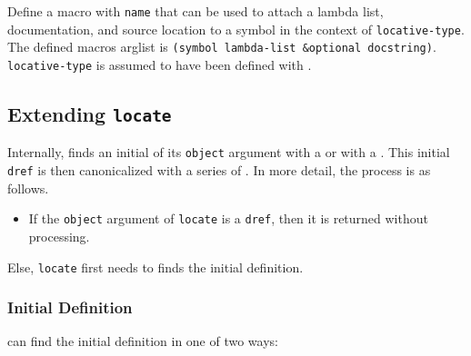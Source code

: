 \begin{itemize}
  Define a macro with \texttt{name} that can be used to attach a lambda
  list, documentation, and source location to a symbol in the context of
  \texttt{locative-type}. The defined macro\textquotesingle s arglist is
  \texttt{(symbol\ lambda-list\ \&optional\ docstring)}.
  \texttt{locative-type} is assumed to have been defined with
  .
\end{itemize}

\subsection{\texorpdfstring{Extending
\texttt{locate}}{Extending locate}}\label{extending-locate}

\label{x-28DREF-EXT-3A-40EXTENDING-LOCATE-20MGL-PAX-3ASECTION-29}

Internally, 
finds an initial  of
its \texttt{object} argument with a
or with a
.
This initial \texttt{dref} is then canonicalized with a series of
.
In more detail, the process is as follows.

\begin{itemize}
\tightlist
\item
  If the \texttt{object} argument of \texttt{locate} is a \texttt{dref},
  then it is returned without processing.
\end{itemize}

Else, \texttt{locate} first needs to finds the initial definition.

\subsubsection{Initial Definition}\label{initial-definition}

\label{x-28DREF-EXT-3A-40INITIAL-DEFINITION-20MGL-PAX-3ASECTION-29}

 can find the
initial definition in one of two ways:


